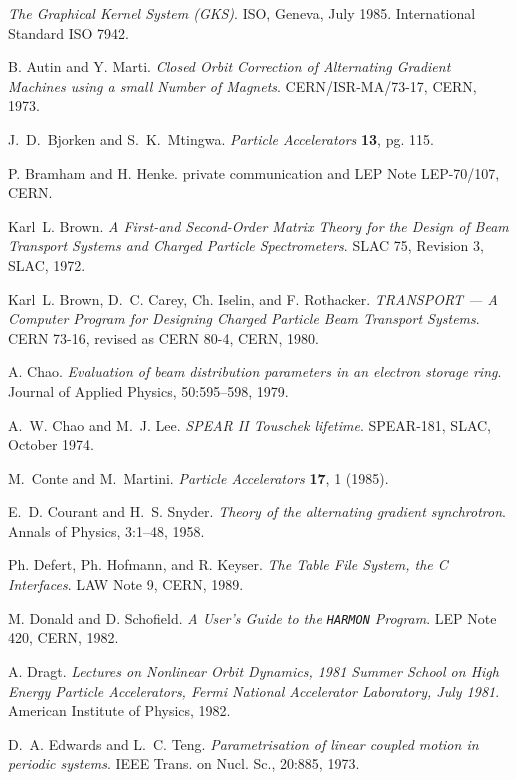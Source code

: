 \clearpage
\begin{thebibliography}{10}
 
{\sl The Graphical Kernel System (GKS)}.
ISO, Geneva, July 1985.
International Standard ISO 7942.
 
B. Autin and Y. Marti.
{\sl Closed Orbit Correction of Alternating Gradient Machines
  using a small Number of Magnets}.
CERN/ISR-MA/73-17, CERN, 1973.
 
J.~D.~Bjorken and S.~K.~Mtingwa.
{\sl Particle Accelerators} {\bf 13}, pg. 115.
 
P. Bramham and H. Henke.
private communication and LEP Note LEP-70/107, CERN.
 
Karl~L. Brown.
{\sl A First-and Second-Order Matrix Theory for the Design
  of Beam Transport Systems and Charged Particle Spectrometers}.
SLAC 75, Revision 3, SLAC, 1972.
 
Karl~L. Brown, D.~C. Carey, Ch. Iselin, and F. Rothacker.
{\sl TRANSPORT --- A Computer Program for Designing Charged
  Particle Beam Transport Systems}.
CERN 73-16, revised as CERN 80-4, CERN, 1980.
 
A. Chao.
{\sl Evaluation of beam distribution parameters in an electron
  storage ring}.
Journal of Applied Physics, 50:595--598, 1979.
 
A.~W. Chao and M.~J. Lee.
{\sl SPEAR II Touschek lifetime}.
SPEAR-181, SLAC, October 1974.
 
M.~Conte and M.~Martini.
{\sl Particle Accelerators} {\bf 17}, 1 (1985).

E.~D. Courant and H.~S. Snyder.
{\sl Theory of the alternating gradient synchrotron}.
Annals of Physics, 3:1--48, 1958.
 
Ph. Defert, Ph. Hofmann, and R. Keyser.
{\sl The Table File System, the C Interfaces}.
LAW Note 9, CERN, 1989.
 
M. Donald and D. Schofield.
{\sl A User's Guide to the {\tt HARMON} Program}.
LEP Note 420, CERN, 1982.
 
A. Dragt.
{\sl Lectures on Nonlinear Orbit Dynamics, 1981 Summer School on High
  Energy Particle Accelerators, Fermi National Accelerator Laboratory, July
  1981}.
American Institute of Physics, 1982.
 
D.~A. Edwards and L.~C. Teng.
{\sl Parametrisation of linear coupled motion in periodic systems}.
IEEE Trans. on Nucl. Sc., 20:885, 1973.
 

\end{thebibliography}
